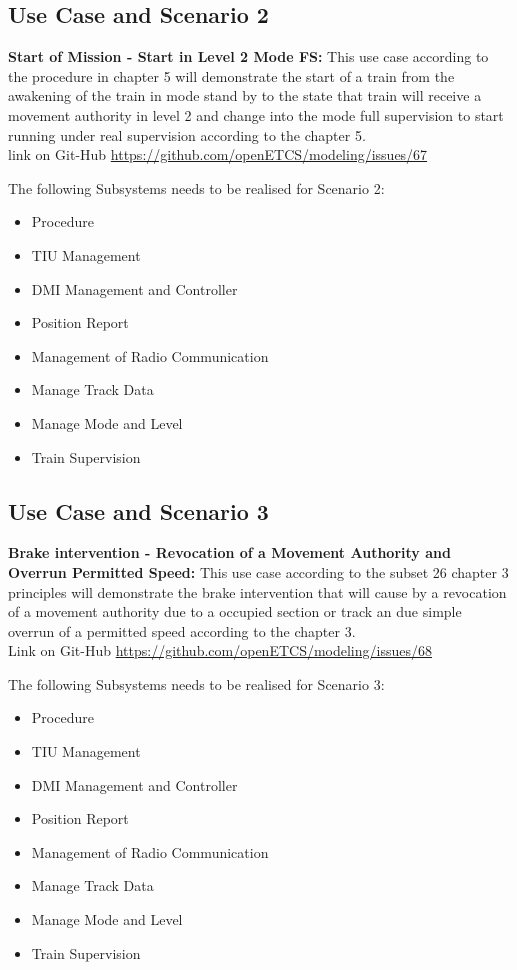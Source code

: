 \subsection{Use Case and Scenario 2}
\textbf{Start of Mission - Start in Level 2 Mode FS:}
This use case according to the procedure in chapter 5 will demonstrate the start of a train from the awakening of the train in mode stand by to the state that train will receive a movement authority in level 2 and change into the mode full supervision to start running under real supervision according to the chapter 5.\\ 
link on Git-Hub \url{https://github.com/openETCS/modeling/issues/67}

The following Subsystems needs to be realised for Scenario 2:\\
\begin{itemize}
\item Procedure
\item TIU Management
\item DMI Management and Controller
\item Position Report
\item Management of Radio Communication
\item Manage Track Data
\item Manage Mode and Level
\item Train Supervision
\end{itemize}

\subsection{Use Case and Scenario 3}
\textbf{Brake intervention - Revocation of a Movement Authority and Overrun Permitted Speed:}
This use case according to the subset 26 chapter 3 principles will demonstrate the brake intervention that will cause by a revocation of a movement authority due to a occupied section or track an due simple overrun of a permitted speed  according to the chapter 3.\\ 
Link on Git-Hub \url{https://github.com/openETCS/modeling/issues/68}

The following Subsystems needs to be realised for Scenario 3:\\
\begin{itemize}
\item Procedure
\item TIU Management
\item DMI Management and Controller
\item Position Report
\item Management of Radio Communication
\item Manage Track Data
\item Manage Mode and Level
\item Train Supervision
\end{itemize}

